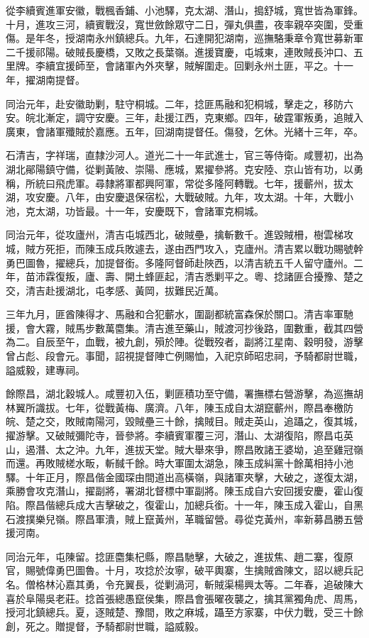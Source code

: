 \begin{pinyinscope}
從李續賓進軍安徽，戰楓香鋪、小池驛，克太湖、潛山，搗舒城，寬世皆為軍鋒。十月，進攻三河，續賓戰沒，寬世斂餘眾守二日，彈丸俱盡，夜率親卒突圍，受重傷。是年冬，授湖南永州鎮總兵。九年，石達開犯湖南，巡撫駱秉章令寬世募新軍二千援祁陽。破賊長慶橋，又敗之長葉嶺。進援寶慶，屯城東，連敗賊長沖口、五里牌。李續宜援師至，會諸軍內外夾擊，賊解圍走。回剿永州土匪，平之。十一年，擢湖南提督。

同治元年，赴安徽助剿，駐守桐城。二年，捻匪馬融和犯桐城，擊走之，移防六安。皖北漸定，調守安慶。三年，赴援江西，克東鄉。四年，破霆軍叛勇，追賊入廣東，會諸軍殲賊於嘉應。五年，回湖南提督任。傷發，乞休。光緒十三年，卒。

石清吉，字祥瑞，直隸沙河人。道光二十一年武進士，官三等侍衛。咸豐初，出為湖北鄖陽鎮守備，從剿黃陂、崇陽、應城，累擢參將。克安陸、京山皆有功，以勇稱，所統曰飛虎軍。尋隸將軍都興阿軍，常從多隆阿轉戰。七年，援蘄州，拔太湖，攻安慶。八年，由安慶退保宿松，大戰破賊。九年，攻太湖。十年，大戰小池，克太湖，功皆最。十一年，安慶既下，會諸軍克桐城。

同治元年，從攻廬州，清吉屯城西北，破賊壘，擒斬數千。進毀賊柵，樹雲梯攻城，賊方死拒，而陳玉成兵敗遽去，遂由西門攻入，克廬州。清吉累以戰功賜號幹勇巴圖魯，擢總兵，加提督銜。多隆阿督師赴陜西，以清吉統五千人留守廬州。二年，苗沛霖復叛，廬、壽、開土蜂匪起，清吉悉剿平之。粵、捻諸匪合擾豫、楚之交，清吉赴援湖北，屯孝感、黃岡，拔難民近萬。

三年九月，匪酋陳得才、馬融和合犯蘄水，圍副都統富森保於關口。清吉率軍馳援，會大霧，賊馬步數萬麕集。清吉進至藥山，賊渡河抄後路，圍數重，截其四營為二。自辰至午，血戰，被九創，殞於陣。從戰歿者，副將江星南、穀明發，游擊曾占彪、段會元。事聞，詔視提督陣亡例賜恤，入祀京師昭忠祠，予騎都尉世職，謚威毅，建專祠。

餘際昌，湖北穀城人。咸豐初入伍，剿匪積功至守備，署撫標右營游擊，為巡撫胡林翼所識拔。七年，從戰黃梅、廣濟。八年，陳玉成自太湖竄蘄州，際昌奉檄防皖、楚之交，敗賊南陽河，毀賊壘三十餘，擒賊目。賊走英山，追躡之，復其城，擢游擊。又破賊彌陀寺，晉參將。李續賓軍覆三河，潛山、太湖復陷，際昌屯英山，遏潛、太之沖。九年，進拔天堂。賊大舉來爭，際昌敗諸王婆坳，追至雞冠嶺而還。再敗賊槎水畈，斬馘千餘。時大軍圍太湖急，陳玉成糾黨十餘萬相持小池驛。十年正月，際昌偕金國琛由間道出高橫嶺，與諸軍夾擊，大破之，遂復太湖，乘勝會攻克潛山，擢副將，署湖北督標中軍副將。陳玉成自六安回援安慶，霍山復陷。際昌偕總兵成大吉擊破之，復霍山，加總兵銜。十一年，陳玉成入霍山，自黑石渡撲樂兒嶺。際昌軍潰，賊上竄黃州，革職留營。尋從克黃州，率新募昌勝五營援河南。

同治元年，屯陳留。捻匪麕集杞縣，際昌馳擊，大破之，進拔焦、趙二寨，復原官，賜號偉勇巴圖魯。十月，攻捻於汝寧，破平輿寨，生擒賊酋陳文，詔以總兵記名。僧格林沁嘉其勇，令充翼長，從剿渦河，斬賊渠楊興太等。二年春，追破陳大喜於阜陽吳老莊。捻首張總愚竄侯集，際昌會張曜夜襲之，擒其黨獨角虎、周馬，授河北鎮總兵。夏，逐賊楚、豫間，敗之麻城，躡至方家寨，中伏力戰，受三十餘創，死之。贈提督，予騎都尉世職，謚威毅。


\end{pinyinscope}
